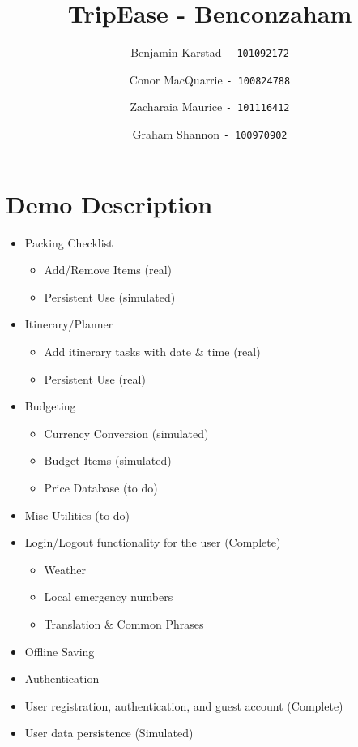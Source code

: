 \documentclass[12pt]{article}
\title{TripEase - Benconzaham}
\author{
Benjamin Karstad
\texttt{- 101092172}
\and
Conor MacQuarrie
\texttt{- 100824788}
\and
Zacharaia Maurice
\texttt{- 101116412}
\and
Graham Shannon
\texttt{- 100970902}
}
\begin{document}
{\tiny
	\maketitle

	\pagebreak

	\section*{Demo Description}

	\begin{itemize}

		\item{Packing Checklist}
		\begin{itemize}
			\item Add/Remove Items (real)
			\item Persistent Use (simulated)
		\end{itemize}

		\item{Itinerary/Planner}
		\begin{itemize}
			\item Add itinerary tasks with date \& time (real)
			\item Persistent Use (real)
		\end{itemize}

		\item{Budgeting}
			\begin{itemize}
				\item Currency Conversion (simulated)
				\item Budget Items (simulated)
				\item Price Database (to do)
			\end{itemize}

		\item{Misc Utilities} (to do)

		\item Login/Logout functionality for the user (Complete)

		\begin{itemize}
			\item Weather
			\item Local emergency numbers
			\item Translation \& Common Phrases
		\end{itemize}

		\item{Offline Saving}

		\item{Authentication}
		    \item User registration, authentication, and guest account (Complete)
		    \item User data persistence  (Simulated)


\end{itemize}}
\end{document}
